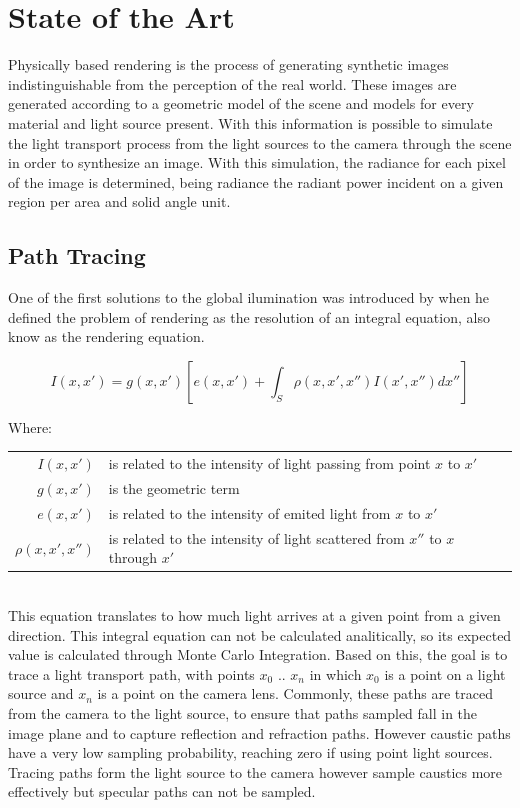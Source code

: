 \chapter{State of the Art}

Physically based rendering is the process of generating synthetic images indistinguishable from the perception of the real world. These images are generated according to a geometric model of the scene and models for every material and light source present. With this information is possible to simulate the light transport process from the light sources to the camera through the scene in order to synthesize an image. With this simulation, the radiance for each pixel of the image is determined, being radiance the radiant power incident on a given region per area and solid angle unit.

\section{Path Tracing}

One of the first solutions to the global ilumination was introduced by \cite{Kajiya} when he defined the problem of rendering as the resolution of an integral equation, also know as the rendering equation.

\begin{equation}
I(x,x')=g(x,x')\left[e(x,x')+\int_{S}^{} \rho(x,x',x'')I(x',x'')dx''\right]
\label{eq:render_eq}
\end{equation}

Where:

\begin{tabular}{r l}
$I(x,x')$ & is related to the intensity of light passing from point $x$ to $x'$ \\
$g(x,x')$ & is the geometric term \\
$e(x,x')$ & is related to the intensity of emited light from $x$ to $x'$ \\
$\rho(x,x',x'')$ & is related to the intensity of light scattered from $x''$ to $x$ through $x'$\\
\end{tabular}
\\

This equation translates to how much light arrives at a given point from a given direction. This integral equation can not be calculated analitically, so its expected value is calculated through Monte Carlo Integration. Based on this, the goal is to trace a light transport path, with points $x_0$ .. $x_n$ in which $x_0$ is a point on a light source and $x_n$ is a point on the camera lens. 
Commonly, these paths are traced from the camera to the light source, to ensure that paths sampled fall in the image plane and to capture reflection and refraction paths. However caustic paths have a very low sampling probability, reaching zero if using point light sources. Tracing paths form the light source to the camera however sample caustics more effectively but specular paths can not be sampled.

